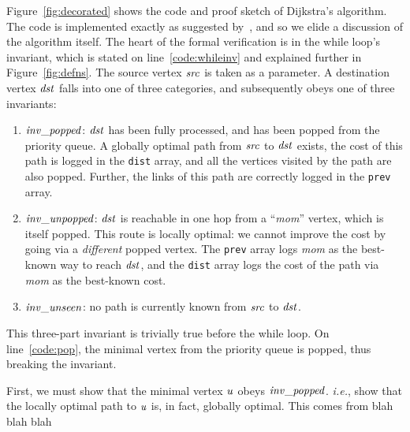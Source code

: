 
Figure~\ref{fig:decorated} shows the code and proof
sketch of Dijkstra's algorithm. 
The code is implemented exactly as suggested 
by~\cite{clrs}, and so we elide a discussion 
of the algorithm itself. The heart of the formal verification is in the 
while loop's invariant, which is stated on line~\ref{code:whileinv}
and explained further in Figure~\ref{fig:defns}.
The source vertex $\mathit{src}$ is taken as a parameter. 
A destination vertex $\mathit{dst}$ falls into one of three
categories, and subsequently obeys one of three invariants:
\begin{enumerate}
\item $\mathit{inv\_popped}$: $\mathit{dst}$ has been fully processed, and has been
popped from the priority queue. 
A globally optimal path from $\mathit{src}$ 
to $\mathit{dst}$ exists, the cost of this path is logged in 
the \texttt{dist} array, and all the vertices visited by the path are also popped.
Further, the links of this path are correctly logged in the \texttt{prev} array.
\item $\mathit{inv\_unpopped}$: $\mathit{dst}$ is reachable in 
one hop from a ``\emph{mom}'' vertex, which is itself popped. 
This route is locally optimal: we cannot 
improve the cost by going via a \emph{different} popped vertex.
The \texttt{prev} array logs
\emph{mom} as the best-known way to reach $\mathit{dst}$, and the \texttt{dist}
array logs the cost of the path via \emph{mom} as the best-known cost.
\item $\mathit{inv\_unseen}$: no path is currently known from $\mathit{src}$ to $\mathit{dst}$.
\end{enumerate}

This three-part invariant is trivially true before the while loop. 
On line~\ref{code:pop}, the minimal vertex from the priority queue is popped, 
thus breaking the invariant.

First, we must show that the minimal vertex $\mathit{u}$ 
obeys $\mathit{inv\_popped}$. \emph{i.e.}, show that the locally 
optimal path to $\mathit{u}$ is, in fact, globally optimal. 
This comes from blah blah blah


